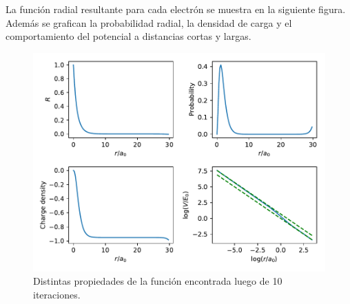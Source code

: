 \documentclass[paper=letter, fontsize=11pt]{scrartcl}
\begin{document}
\pagebreak
La funci\'on radial resultante para cada electr\'on se muestra en la siguiente figura. Adem\'as se grafican la probabilidad radial, la densidad de carga y el comportamiento del potencial a distancias cortas y largas.
\begin{figure}[ht]
	\centering
	\includegraphics[width=\linewidth]{complete.pdf}
	\caption{Distintas propiedades de la funci\'on encontrada luego de 10 iteraciones.}
\end{figure}
\end{document}
